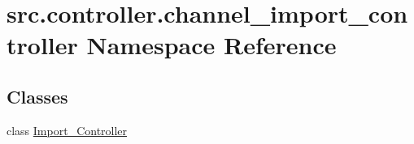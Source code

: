 \hypertarget{namespacesrc_1_1controller_1_1channel__import__controller}{}\section{src.\+controller.\+channel\+\_\+import\+\_\+controller Namespace Reference}
\label{namespacesrc_1_1controller_1_1channel__import__controller}
\subsection*{Classes}
\begin{DoxyCompactItemize}
\item 
class \hyperlink{classsrc_1_1controller_1_1channel__import__controller_1_1Import__Controller}{Import\+\_\+\+Controller}
\end{DoxyCompactItemize}
